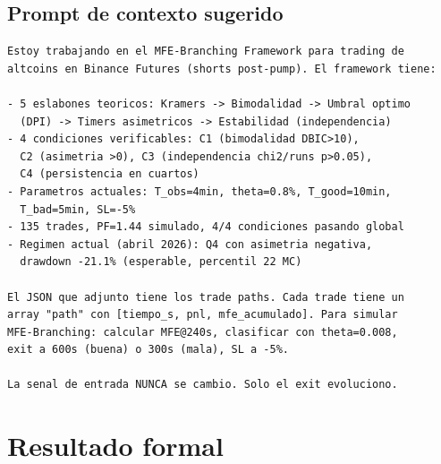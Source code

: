 \documentclass[11pt,a4paper]{article}
\begin{document}
\subsection{Prompt de contexto sugerido}
 
\begin{lstlisting}[language={},caption={Copiar esto al inicio de un nuevo chat}]
Estoy trabajando en el MFE-Branching Framework para trading de
altcoins en Binance Futures (shorts post-pump). El framework tiene:
 
- 5 eslabones teoricos: Kramers -> Bimodalidad -> Umbral optimo
  (DPI) -> Timers asimetricos -> Estabilidad (independencia)
- 4 condiciones verificables: C1 (bimodalidad DBIC>10),
  C2 (asimetria >0), C3 (independencia chi2/runs p>0.05),
  C4 (persistencia en cuartos)
- Parametros actuales: T_obs=4min, theta=0.8%, T_good=10min,
  T_bad=5min, SL=-5%
- 135 trades, PF=1.44 simulado, 4/4 condiciones pasando global
- Regimen actual (abril 2026): Q4 con asimetria negativa, 
  drawdown -21.1% (esperable, percentil 22 MC)
 
El JSON que adjunto tiene los trade paths. Cada trade tiene un 
array "path" con [tiempo_s, pnl, mfe_acumulado]. Para simular 
MFE-Branching: calcular MFE@240s, clasificar con theta=0.008,
exit a 600s (buena) o 300s (mala), SL a -5%.
 
La senal de entrada NUNCA se cambio. Solo el exit evoluciono.
\end{lstlisting}
 
\section{Resultado formal}
 
\end{document}
